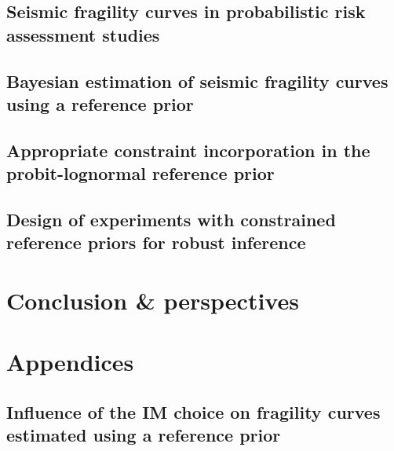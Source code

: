 \documentclass[a4paper]{book}
\begin{document}
\chapter{Seismic fragility curves in probabilistic risk assessment studies}\label{chap:frags-intro}




\chapter{Bayesian estimation of seismic fragility curves using a reference prior}\label{chap:prem}




\chapter{Appropriate constraint incorporation in the probit-lognormal reference prior%
}\label{chap:constrained-frags}




\chapter{Design of experiments with constrained reference priors for robust inference%
}\label{chap:doe}






\part{Conclusion \& perspectives}\label{part:conclusion}


\appendix
\part*{Appendices}\label{part:appendix}


\chapter{Influence of the IM choice on fragility curves estimated using a reference prior}\label{app:chap:uncecomp}
\end{document}
